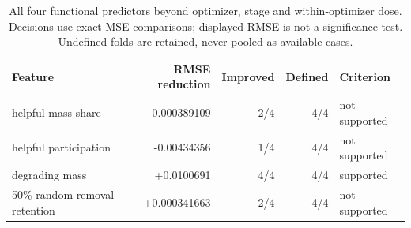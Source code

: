 {\begin{table}[t]
\label{tab:dimension-utilization}
\end{table}
\begin{table}[t]
\centering\small
\begin{tabular}{lrrrl}\toprule
Feature & RMSE reduction & Improved & Defined & Criterion \\
\midrule
helpful mass share & -0.000389109 & 2/4 & 4/4 & not supported \\
helpful participation & -0.00434356 & 1/4 & 4/4 & not supported \\
degrading mass & +0.0100691 & 4/4 & 4/4 & supported \\
50\% random-removal retention & +0.000341663 & 2/4 & 4/4 & not supported \\
\bottomrule\end{tabular}
\caption{All four functional predictors beyond optimizer, stage and within-optimizer dose. Decisions use exact MSE comparisons; displayed RMSE is not a significance test. Undefined folds are retained, never pooled as available cases.}
\end{table}%
}
